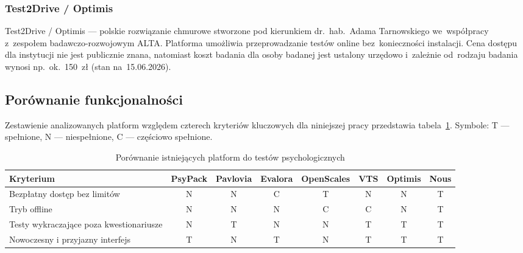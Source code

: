 \documentclass[12pt, a4paper, oneside]{report}
\begin{document}
\subsubsection{Test2Drive / Optimis}

Test2Drive / Optimis --- polskie rozwiązanie chmurowe stworzone pod
kierunkiem dr.~hab.~Adama Tarnowskiego we~współpracy z~zespołem
badawczo-rozwojowym ALTA. Platforma umożliwia przeprowadzanie testów
online bez~konieczności instalacji. Cena dostępu dla instytucji nie
jest publicznie znana, natomiast koszt badania dla osoby badanej jest
ustalony urzędowo i~zależnie od~rodzaju badania wynosi np.~ok.~150~zł
(stan na~15.06.2026).


\subsection{Porównanie funkcjonalności}
\label{subsec:porownanie}

Zestawienie analizowanych platform względem czterech kryteriów kluczowych
dla niniejszej pracy przedstawia tabela~\ref{tab:porownanie}.
Symbole: T --- spełnione, N --- niespełnione, C --- częściowo spełnione.

\begin{table}[H]
	\centering
	\caption{Porównanie istniejących platform do testów psychologicznych}
	\label{tab:porownanie}
	\footnotesize
	\begin{tabular}{p{3.5cm}ccccccc}
		\toprule
		\textbf{Kryterium}
		                                        & \textbf{PsyPack}
		                                        & \textbf{Pavlovia}
		                                        & \textbf{Evalora}
		                                        & \textbf{OpenScales}
		                                        & \textbf{VTS}
		                                        & \textbf{Optimis}
		                                        & \textbf{Nous}                               \\
		\midrule
		Bezpłatny dostęp bez limitów            & N                   & N & C & T & N & N & T \\
		Tryb offline                            & N                   & N & N & C & C & N & T \\
		Testy wykraczające poza kwestionariusze & N                   & T & N & N & T & T & T \\
		Nowoczesny i przyjazny interfejs        & T                   & N & T & N & T & T & T \\
		\bottomrule
	\end{tabular}
\end{table}
\end{document}
